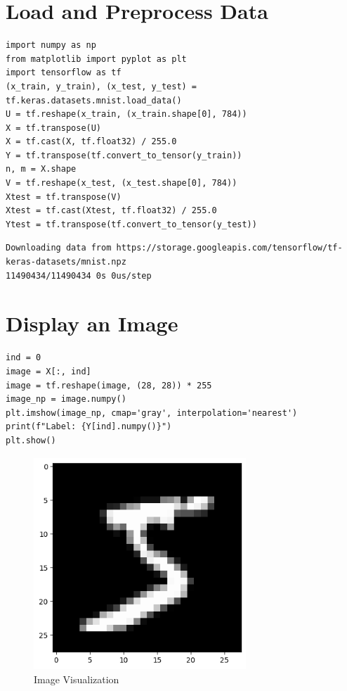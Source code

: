 \newpage

\vspace{-.15cm}
\section{Load and Preprocess Data}
\vspace{-.75cm}
\begin{code}
\begin{lstlisting}
import numpy as np
from matplotlib import pyplot as plt
import tensorflow as tf
(x_train, y_train), (x_test, y_test) = tf.keras.datasets.mnist.load_data()
U = tf.reshape(x_train, (x_train.shape[0], 784))
X = tf.transpose(U)
X = tf.cast(X, tf.float32) / 255.0
Y = tf.transpose(tf.convert_to_tensor(y_train))
n, m = X.shape
V = tf.reshape(x_test, (x_test.shape[0], 784))
Xtest = tf.transpose(V)
Xtest = tf.cast(Xtest, tf.float32) / 255.0
Ytest = tf.transpose(tf.convert_to_tensor(y_test))
\end{lstlisting}
\end{code}
\vspace{-1cm}
\begin{verbatim} 
Downloading data from https://storage.googleapis.com/tensorflow/tf-keras-datasets/mnist.npz
11490434/11490434 0s 0us/step

\end{verbatim}
\vspace{-.6cm}
\section{ Display an Image}
\vspace{-.75cm}
\begin{code}
\begin{lstlisting}
ind = 0
image = X[:, ind]
image = tf.reshape(image, (28, 28)) * 255
image_np = image.numpy()
plt.imshow(image_np, cmap='gray', interpolation='nearest')
print(f"Label: {Y[ind].numpy()}")
plt.show()
\end{lstlisting}
\end{code}
\vspace{-1cm}
    \begin{figure}[h!]
        \centering
        \includegraphics[width=8cm, height=8cm]{ass6pic.png}
        \caption{Image Visualization}
        \label{fig:image_visualization}
    \end{figure}         

